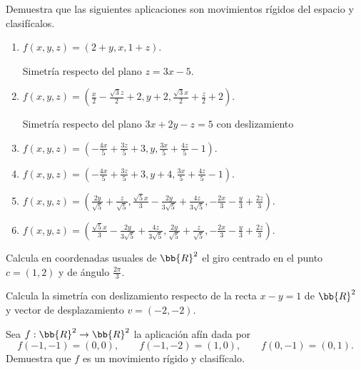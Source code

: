 \begin{ejercicio}
    Demuestra que las siguientes aplicaciones son movimientos rígidos del espacio y clasifícalos.
    \begin{enumerate}
        \item $f\left(x, y, z\right) = \left(2 + y, x, 1 + z\right)$.
        
        Simetría respecto del plano $z=3x-5$.
        
        \item $f\left(x, y, z\right) = \left(\frac{x}{2} -\frac{\sqrt{3} z}{2} + 2, y + 2,\frac{\sqrt{3} x}{2} + \frac{z}{2} + 2\right)$.

        Simetría respecto del plano $3x+2y-z=5$ con deslizamiento
        
        \item $f\left(x, y, z\right) = \left(-\frac{4x}{5} + \frac{3z}{5} + 3, y, \frac{3x}{5} + \frac{4z}{5} - 1\right)$.
        \item $f\left(x, y, z\right) = \left(-\frac{4x}{5} + \frac{3z}{5} + 3, y + 4, \frac{3x}{5} + \frac{4z}{5} - 1\right)$.
        \item $f\left(x, y, z\right) = \left(\frac{2y}{\sqrt{5}} + \frac{z}{\sqrt{5}},\frac{\sqrt{5}x}{3} - \frac{2y}{3\sqrt{5}} + \frac{4z}{3\sqrt{5}}, -\frac{2x}{3} - \frac{y}{3} + \frac{2z}{3}\right)$.
        \item $f\left(x, y, z\right) = \left(\frac{\sqrt{5} x}{3} - \frac{2y}{3\sqrt{5}} + \frac{4z}{3\sqrt{5}}, \frac{2y}{\sqrt{5}} + \frac{z}{\sqrt{5}}, -\frac{2x}{3}- \frac{y}{3} + \frac{2z}{3}\right)$.
    \end{enumerate}
\end{ejercicio}

\begin{ejercicio}
    Calcula en coordenadas usuales de $\bb{R}^2$ el giro centrado en el punto $c = (1, 2)$ y de ángulo $\frac{2\pi}{3}$.
\end{ejercicio}

\begin{ejercicio}
    Calcula la simetría con deslizamiento respecto de la recta $x - y = 1$ de $\bb{R}^2$ y vector de desplazamiento $v = (-2, -2)$.
\end{ejercicio}

\begin{ejercicio}
    Sea $f : \bb{R}^2\to \bb{R}^2$ la aplicación afín dada por
    \begin{equation*}
        f(-1, -1) = (0, 0),\qquad  f(-1, -2) = (1, 0),\qquad f(0, -1) = (0, 1).
    \end{equation*}
    Demuestra que $f$ es un movimiento rígido y clasifícalo.
\end{ejercicio}

